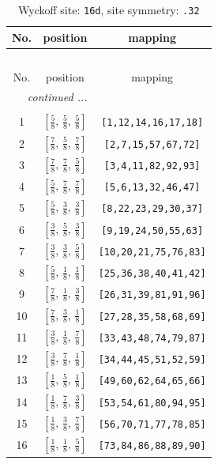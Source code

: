 \documentclass[fleqn,8pt]{jsarticle}
\begin{document}
\renewcommand{\arraystretch}{1.2}
\begin{longtable}{ccc}
\caption{Wyckoff site: {\tt 16d}, site symmetry: {\tt .32}}
 \\
 \hline \hline
No. & position & mapping \\ \hline \endfirsthead

\multicolumn{2}{l}{\tablename\ \thetable{}} \\
 \hline \hline
No. & position & mapping \\ \hline \endhead

 \hline \hline
\multicolumn{2}{r}{\footnotesize\it continued ...} \\ \endfoot

 \hline \hline
\multicolumn{2}{r}{} \\ \endlastfoot

1 & $\left[ \frac{5}{8},\, \frac{5}{8},\, \frac{5}{8} \right]$ & {\tt [1,12,14,16,17,18]} \\ \hline
2 & $\left[ \frac{7}{8},\, \frac{5}{8},\, \frac{7}{8} \right]$ & {\tt [2,7,15,57,67,72]} \\ \hline
3 & $\left[ \frac{7}{8},\, \frac{7}{8},\, \frac{5}{8} \right]$ & {\tt [3,4,11,82,92,93]} \\ \hline
4 & $\left[ \frac{5}{8},\, \frac{7}{8},\, \frac{7}{8} \right]$ & {\tt [5,6,13,32,46,47]} \\ \hline
5 & $\left[ \frac{5}{8},\, \frac{3}{8},\, \frac{3}{8} \right]$ & {\tt [8,22,23,29,30,37]} \\ \hline
6 & $\left[ \frac{3}{8},\, \frac{5}{8},\, \frac{3}{8} \right]$ & {\tt [9,19,24,50,55,63]} \\ \hline
7 & $\left[ \frac{3}{8},\, \frac{3}{8},\, \frac{5}{8} \right]$ & {\tt [10,20,21,75,76,83]} \\ \hline
8 & $\left[ \frac{5}{8},\, \frac{1}{8},\, \frac{1}{8} \right]$ & {\tt [25,36,38,40,41,42]} \\ \hline
9 & $\left[ \frac{7}{8},\, \frac{1}{8},\, \frac{3}{8} \right]$ & {\tt [26,31,39,81,91,96]} \\ \hline
10 & $\left[ \frac{7}{8},\, \frac{3}{8},\, \frac{1}{8} \right]$ & {\tt [27,28,35,58,68,69]} \\ \hline
11 & $\left[ \frac{3}{8},\, \frac{1}{8},\, \frac{7}{8} \right]$ & {\tt [33,43,48,74,79,87]} \\ \hline
12 & $\left[ \frac{3}{8},\, \frac{7}{8},\, \frac{1}{8} \right]$ & {\tt [34,44,45,51,52,59]} \\ \hline
13 & $\left[ \frac{1}{8},\, \frac{5}{8},\, \frac{1}{8} \right]$ & {\tt [49,60,62,64,65,66]} \\ \hline
14 & $\left[ \frac{1}{8},\, \frac{7}{8},\, \frac{3}{8} \right]$ & {\tt [53,54,61,80,94,95]} \\ \hline
15 & $\left[ \frac{1}{8},\, \frac{3}{8},\, \frac{7}{8} \right]$ & {\tt [56,70,71,77,78,85]} \\ \hline
16 & $\left[ \frac{1}{8},\, \frac{1}{8},\, \frac{5}{8} \right]$ & {\tt [73,84,86,88,89,90]} \\
\end{longtable}
\end{document}
